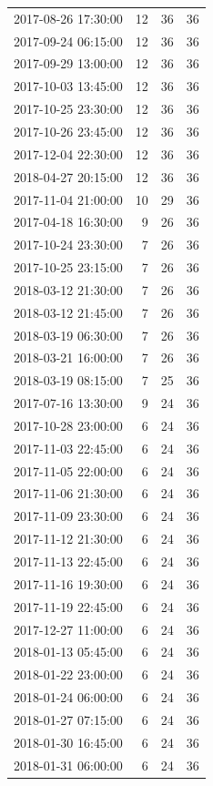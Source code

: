 \begin{tabular}{lrrr}
2017-08-26 17:30:00 & 12 & 36 & 36 \\
2017-09-24 06:15:00 & 12 & 36 & 36 \\
2017-09-29 13:00:00 & 12 & 36 & 36 \\
2017-10-03 13:45:00 & 12 & 36 & 36 \\
2017-10-25 23:30:00 & 12 & 36 & 36 \\
2017-10-26 23:45:00 & 12 & 36 & 36 \\
2017-12-04 22:30:00 & 12 & 36 & 36 \\
2018-04-27 20:15:00 & 12 & 36 & 36 \\
2017-11-04 21:00:00 & 10 & 29 & 36 \\
2017-04-18 16:30:00 & 9 & 26 & 36 \\
2017-10-24 23:30:00 & 7 & 26 & 36 \\
2017-10-25 23:15:00 & 7 & 26 & 36 \\
2018-03-12 21:30:00 & 7 & 26 & 36 \\
2018-03-12 21:45:00 & 7 & 26 & 36 \\
2018-03-19 06:30:00 & 7 & 26 & 36 \\
2018-03-21 16:00:00 & 7 & 26 & 36 \\
2018-03-19 08:15:00 & 7 & 25 & 36 \\
2017-07-16 13:30:00 & 9 & 24 & 36 \\
2017-10-28 23:00:00 & 6 & 24 & 36 \\
2017-11-03 22:45:00 & 6 & 24 & 36 \\
2017-11-05 22:00:00 & 6 & 24 & 36 \\
2017-11-06 21:30:00 & 6 & 24 & 36 \\
2017-11-09 23:30:00 & 6 & 24 & 36 \\
2017-11-12 21:30:00 & 6 & 24 & 36 \\
2017-11-13 22:45:00 & 6 & 24 & 36 \\
2017-11-16 19:30:00 & 6 & 24 & 36 \\
2017-11-19 22:45:00 & 6 & 24 & 36 \\
2017-12-27 11:00:00 & 6 & 24 & 36 \\
2018-01-13 05:45:00 & 6 & 24 & 36 \\
2018-01-22 23:00:00 & 6 & 24 & 36 \\
2018-01-24 06:00:00 & 6 & 24 & 36 \\
2018-01-27 07:15:00 & 6 & 24 & 36 \\
2018-01-30 16:45:00 & 6 & 24 & 36 \\
2018-01-31 06:00:00 & 6 & 24 & 36 \\

\end{tabular}
